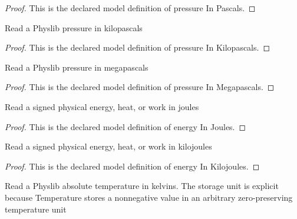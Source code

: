 \begin{proof}
  This is the declared model definition of pressure In Pascals.
\end{proof}
\begin{definition}
  \label{def:physics:phyx-mini-0462:phyxminiproblems-problemphyxmini0462-pressureinkilopascals}
  Read a Physlib pressure in kilopascals
\end{definition}
\begin{proof}
  This is the declared model definition of pressure In Kilopascals.
\end{proof}
\begin{definition}
  \label{def:physics:phyx-mini-0462:phyxminiproblems-problemphyxmini0462-pressureinmegapascals}
  Read a Physlib pressure in megapascals
\end{definition}
\begin{proof}
  This is the declared model definition of pressure In Megapascals.
\end{proof}
\begin{definition}
  \label{def:physics:phyx-mini-0462:phyxminiproblems-problemphyxmini0462-energyinjoules}
  Read a signed physical energy, heat, or work in joules
\end{definition}
\begin{proof}
  This is the declared model definition of energy In Joules.
\end{proof}
\begin{definition}
  \label{def:physics:phyx-mini-0462:phyxminiproblems-problemphyxmini0462-energyinkilojoules}
  Read a signed physical energy, heat, or work in kilojoules
\end{definition}
\begin{proof}
  This is the declared model definition of energy In Kilojoules.
\end{proof}
\begin{definition}
  \label{def:physics:phyx-mini-0462:phyxminiproblems-problemphyxmini0462-temperatureinkelvin}
  Read a Physlib absolute temperature in kelvins. The storage unit is explicit because Temperature stores a nonnegative value in an arbitrary zero-preserving temperature unit
\end{definition}
